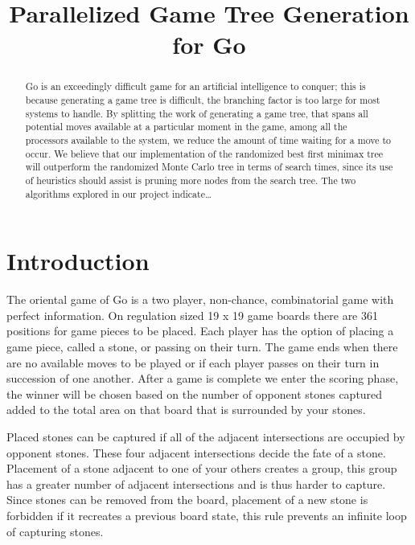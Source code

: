 \documentclass[conference]{IEEEtran}
\begin{document}
\title{Parallelized Game Tree Generation\\for Go}


\author{
}

\maketitle


\begin{abstract}
Go is an exceedingly difficult game for an artificial intelligence to conquer; this is because generating a game tree is difficult, the branching factor is too large for most systems to handle. By splitting the work of generating a game tree, that spans all potential moves available at a particular moment in the game, among all the processors available to the system, we reduce the amount of time waiting for a move to occur. We believe that our implementation of the randomized best first minimax tree will outperform the randomized Monte Carlo tree in terms of search times, since its use of heuristics should assist is pruning more nodes from the search tree. The two algorithms explored in our project indicate\dots

\end{abstract}


\section{Introduction}
The oriental game of Go is a two player, non-chance, combinatorial game with perfect information. On regulation sized 19 x 19 game boards there are 361 positions for game pieces to be placed. Each player has the option of placing a game piece, called a stone, or passing on their turn. The game ends when there are no available moves to be played or if each player passes on their turn in succession of one another. After a game is complete we enter the scoring phase, the winner will be chosen based on the number of opponent stones captured added to the total area on that board that is surrounded by your stones.\par
Placed stones can be captured if all of the adjacent intersections are occupied by opponent stones. These four adjacent intersections decide the fate of a stone. Placement of a stone adjacent to one of your others creates a group, this group has a greater number of adjacent intersections and is thus harder to capture. Since stones can be removed from the board, placement of a new stone is forbidden if it recreates a previous board state, this rule prevents an infinite loop of capturing stones.
\end{document}

